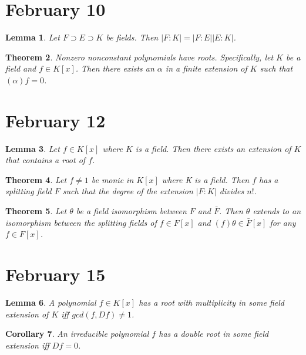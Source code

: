 \documentclass[letterpaper]{article}
\newtheorem{theorem}{Theorem}[section]
\newtheorem{lemma}[theorem]{Lemma}
\newtheorem{corollary}[theorem]{Corollary}
\begin{document}
\section{February 10}

\begin{lemma}
Let $F \supset E \supset K$ be fields. Then $|F \colon K| = |F \colon E||E \colon K|$.
\end{lemma}

\begin{theorem}
Nonzero nonconstant polynomials have roots. Specifically, let $K$ be a field and $f \in K[x]$. Then there exists an $\alpha$ in a finite extension of $K$ such that $(\alpha)f = 0$.
\end{theorem}

\section{February 12}

\begin{lemma}
Let $f \in K[x]$ where $K$ is a field.  Then there exists an extension of $K$ that contains a root of $f$.
\end{lemma}

\begin{theorem}
Let $f \neq 1$ be monic in $K[x]$ where K is a field.  Then $f$ has a splitting field $F$ such that the degree of the extension $|F \colon K|$  divides $n!$.
\end{theorem}

\begin{theorem}
Let $\theta$ be a field isomorphism between $F$ and $\bar{F}$. Then $\theta$ extends to an isomorphism between the splitting fields of $f \in F[x]$ and $(f) \theta \in \bar{F}[x]$ for any $f \in F[x]$.
\end{theorem}

\section{February 15}

\begin{lemma}
A polynomial $f \in K[x]$ has a root with multiplicity in some field extension of $K$ iff $gcd(f, Df) \ne 1$.
\end{lemma}

\begin{corollary}
An irreducible polynomial $f$ has a double root in some field extension iff $Df = 0$.
\end{corollary}
\end{document}
